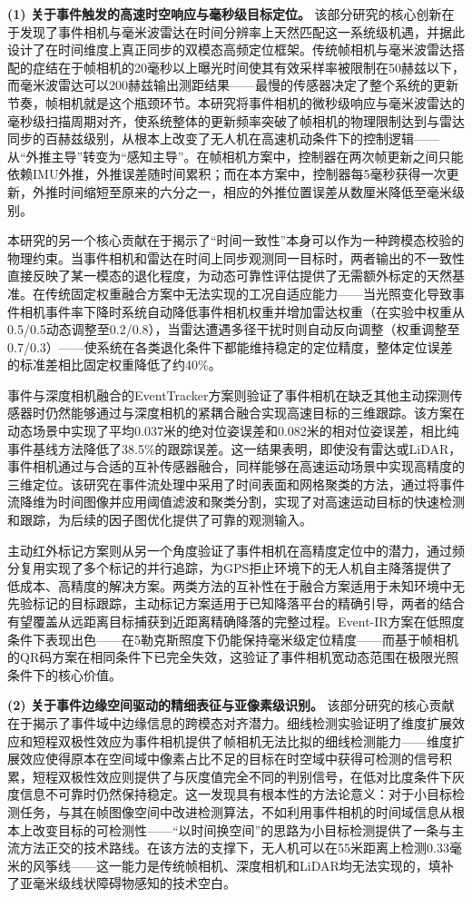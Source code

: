 \textbf{(1) 关于事件触发的高速时空响应与毫秒级目标定位。} 该部分研究的核心创新在于发现了事件相机与毫米波雷达在时间分辨率上天然匹配这一系统级机遇，并据此设计了在时间维度上真正同步的双模态高频定位框架。传统帧相机与毫米波雷达搭配的症结在于帧相机的20毫秒以上曝光时间使其有效采样率被限制在50赫兹以下，而毫米波雷达可以200赫兹输出测距结果——最慢的传感器决定了整个系统的更新节奏，帧相机就是这个瓶颈环节。本研究将事件相机的微秒级响应与毫米波雷达的毫秒级扫描周期对齐，使系统整体的更新频率突破了帧相机的物理限制达到与雷达同步的百赫兹级别，从根本上改变了无人机在高速机动条件下的控制逻辑——从“外推主导”转变为“感知主导”。在帧相机方案中，控制器在两次帧更新之间只能依赖IMU外推，外推误差随时间累积；而在本方案中，控制器每5毫秒获得一次更新，外推时间缩短至原来的六分之一，相应的外推位置误差从数厘米降低至毫米级别。

本研究的另一个核心贡献在于揭示了“时间一致性”本身可以作为一种跨模态校验的物理约束。当事件相机和雷达在时间上同步观测同一目标时，两者输出的不一致性直接反映了某一模态的退化程度，为动态可靠性评估提供了无需额外标定的天然基准。在传统固定权重融合方案中无法实现的工况自适应能力——当光照变化导致事件相机事件率下降时系统自动降低事件相机权重并增加雷达权重（在实验中权重从0.5/0.5动态调整至0.2/0.8），当雷达遭遇多径干扰时则自动反向调整（权重调整至0.7/0.3）——使系统在各类退化条件下都能维持稳定的定位精度，整体定位误差的标准差相比固定权重降低了约40\%。

事件与深度相机融合的EventTracker方案则验证了事件相机在缺乏其他主动探测传感器时仍然能够通过与深度相机的紧耦合融合实现高速目标的三维跟踪。该方案在动态场景中实现了平均0.037米的绝对位姿误差和0.082米的相对位姿误差，相比纯事件基线方法降低了38.5\%的跟踪误差。这一结果表明，即使没有雷达或LiDAR，事件相机通过与合适的互补传感器融合，同样能够在高速运动场景中实现高精度的三维定位。该研究在事件流处理中采用了时间表面和网格聚类的方法，通过将事件流降维为时间图像并应用阈值滤波和聚类分割，实现了对高速运动目标的快速检测和跟踪，为后续的因子图优化提供了可靠的观测输入。

主动红外标记方案则从另一个角度验证了事件相机在高精度定位中的潜力，通过频分复用实现了多个标记的并行追踪，为GPS拒止环境下的无人机自主降落提供了低成本、高精度的解决方案。两类方法的互补性在于融合方案适用于未知环境中无先验标记的目标跟踪，主动标记方案适用于已知降落平台的精确引导，两者的结合有望覆盖从远距离目标捕获到近距离精确降落的完整过程。Event-IR方案在低照度条件下表现出色——在5勒克斯照度下仍能保持毫米级定位精度——而基于帧相机的QR码方案在相同条件下已完全失效，这验证了事件相机宽动态范围在极限光照条件下的核心价值。

\textbf{(2) 关于事件边缘空间驱动的精细表征与亚像素级识别。} 该部分研究的核心贡献在于揭示了事件域中边缘信息的跨模态对齐潜力。细线检测实验证明了维度扩展效应和短程双极性效应为事件相机提供了帧相机无法比拟的细线检测能力——维度扩展效应使得原本在空间域中像素占比不足的目标在时空域中获得可检测的信号积累，短程双极性效应则提供了与灰度值完全不同的判别信号，在低对比度条件下灰度信息不可靠时仍然保持稳定。这一发现具有根本性的方法论意义：对于小目标检测任务，与其在帧图像空间中改进检测算法，不如利用事件相机的时间域信息从根本上改变目标的可检测性——“以时间换空间”的思路为小目标检测提供了一条与主流方法正交的技术路线。在该方法的支撑下，无人机可以在55米距离上检测0.33毫米的风筝线——这一能力是传统帧相机、深度相机和LiDAR均无法实现的，填补了亚毫米级线状障碍物感知的技术空白。

